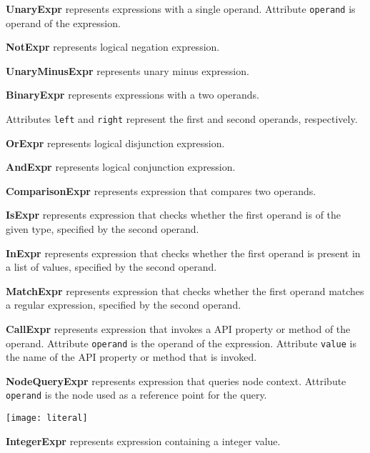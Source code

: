 \documentclass[parskip=full]{uvamscse}
\begin{document}
\begin{description}
\item\textbf{UnaryExpr} represents expressions with a single operand. Attribute \texttt{operand} is operand of the expression.

\item\textbf{NotExpr} represents logical negation expression.

\item\textbf{UnaryMinusExpr} represents unary minus expression.

\item\textbf{BinaryExpr} represents expressions with a two operands.

Attributes \texttt{left} and \texttt{right} represent the first and second operands, respectively.

\item\textbf{OrExpr} represents logical disjunction expression.

\item\textbf{AndExpr} represents logical conjunction expression.

\item\textbf{ComparisonExpr} represents expression that compares two operands.

\item\textbf{IsExpr} represents expression that checks whether the first operand is of the given type, specified by the second operand.

\item\textbf{InExpr} represents expression that checks whether the first operand is present in a list of values, specified by the second operand.

\item\textbf{MatchExpr} represents expression that checks whether the first operand matches a regular expression, specified by the second operand.

\item\textbf{CallExpr} represents expression that invokes a API property or method of the operand. Attribute \texttt{operand} is the operand of the expression. Attribute \texttt{value} is the name of the API property or method that is invoked.

\item\textbf{NodeQueryExpr} represents expression that queries node context. Attribute \texttt{operand} is the node used as a reference point for the query.


\texttt{[image: literal]}

\item\textbf{IntegerExpr} represents expression containing a integer value.


\end{description}
\end{document}

